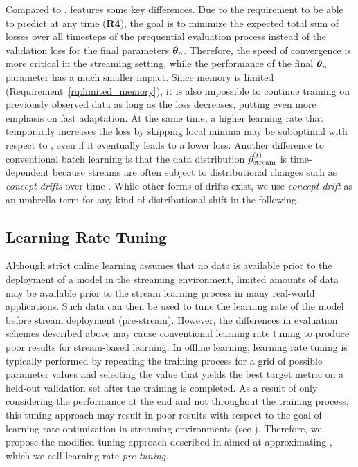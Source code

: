\documentclass{article} %
\begin{document}
Compared to ,  features some key differences.
Due to the requirement to be able to predict at any time (\textbf{R4}), the goal is to minimize the expected total sum of losses over all timesteps of the prequential evaluation process instead of the validation loss for the final parameters ${\bm{\theta}}_n$.
Therefore, the speed of convergence is more critical in the streaming setting, while the performance of the final ${\bm{\theta}}_n$ parameter has a much smaller impact.
Since memory is limited (Requirement~\ref{rq:limited_memory}), it is also impossible to continue training on previously observed data as long as the loss decreases, putting even more emphasis on fast adaptation.
At the same time, a higher learning rate that temporarily increases the loss by skipping local minima may be suboptimal with respect to , even if it eventually leads to a lower loss.
Another difference to conventional batch learning is that the data distribution $\hat{p}_{\rm{stream}}^{(t)}$ is time-dependent because streams are often subject to distributional changes such as \textit{concept drifts} over time \citep{widmerLearningPresenceConcept1996}.
While other forms of drifts exist, we use \textit{concept drift} as an umbrella term for any kind of distributional shift in the following.

\subsection{Learning Rate Tuning}\label{subsec:pre-tuning}

Although strict online learning assumes that no data is available prior to the deployment of a model in the streaming environment, limited amounts of data may be available prior to the stream learning process in many real-world applications.
Such data can then be used to tune the learning rate of the model before stream deployment (pre-stream).
However, the differences in evaluation schemes described above may cause conventional learning rate tuning to produce poor results for stream-based learning.
In offline learning, learning rate tuning is typically performed by repeating the training process for a grid of possible parameter values and selecting the value that yields the best target metric on a held-out validation set after the training is completed.
As a result of only considering the performance at the end and not throughout the training process, this tuning approach may result in poor results with respect to the goal of learning rate optimization in streaming environments (see ).
Therefore, we propose the modified tuning approach described in  aimed at approximating , which we call learning rate \textit{pre-tuning}.
\end{document}
